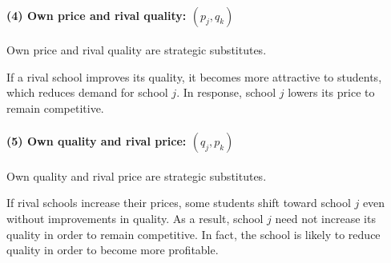 \documentclass[12pt]{article}
\begin{document}
\paragraph{(4) Own price and rival quality: $(p_j,q_k)$}

Own price and rival quality are strategic substitutes.

If a rival school improves its quality, it becomes more attractive to students, which reduces demand for school $j$. In response, school $j$ lowers its price to remain competitive.

\paragraph{(5) Own quality and rival price: $(q_j,p_k)$}

Own quality and rival price are strategic substitutes.

If rival schools increase their prices, some students shift toward school $j$ even without improvements in quality. As a result, school $j$ need not increase its quality in order to remain competitive. In fact, the school is likely to reduce quality in order to become more profitable.
\end{document}
